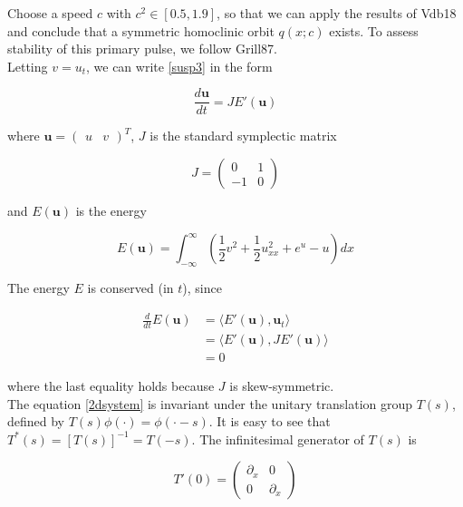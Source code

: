 \documentclass[12pt]{article}
\begin{document}
Choose a speed $c$ with $c^2 \in [0.5, 1.9]$, so that we can apply the results of Vdb18 and conclude that a symmetric homoclinic orbit $q(x; c)$ exists. To assess stability of this primary pulse, we follow Grill87.\\

Letting $v = u_t$, we can write \eqref{susp3} in the form 

\begin{equation}\label{2dsystem}
\frac{d \textbf{u} }{dt} = J E'(\textbf{u})
\end{equation}

where $\textbf{u} = \begin{pmatrix}u&v\end{pmatrix}^T$, $J$ is the standard symplectic matrix

\begin{equation*}
J = \begin{pmatrix}0 & 1 \\ -1 & 0 \end{pmatrix}
\end{equation*}

and $E(\textbf{u})$ is the energy

\begin{equation}\label{energy}
E(\textbf{u}) = \int_{-\infty}^\infty \left(\frac{1}{2} v^2 + \frac{1}{2}u_{xx}^2 + e^{u} - u \right)dx
\end{equation}

The energy $E$ is conserved (in $t$), since

\begin{align*}
\frac{d}{dt} E(\textbf{u}) &= \langle E'(\textbf{u}), \textbf{u}_t \rangle \\
&= \langle E'(\textbf{u}), J E'(\textbf{u}) \rangle \\
&= 0
\end{align*}

where the last equality holds because $J$ is skew-symmetric.\\

The equation \eqref{2dsystem} is invariant under the unitary translation group $T(s)$, defined by $T(s)\phi(\cdot) = \phi(\cdot - s)$. It is easy to see that $T^*(s) = [T(s)]^{-1} = T(-s)$. The infinitesimal generator of $T(s)$ is

\begin{equation}
T'(0) = \begin{pmatrix}\partial_x & 0 \\ 0 & \partial_x \end{pmatrix}
\end{equation}
\end{document}
